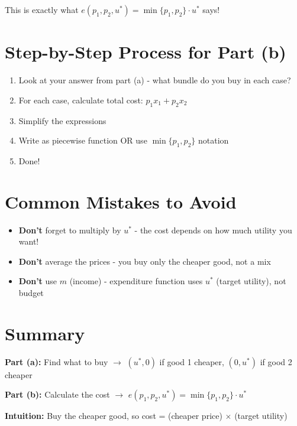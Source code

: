 \documentclass[11pt]{article}
\begin{document}
This is exactly what $e(p_1, p_2, u^*) = \min\{p_1, p_2\} \cdot u^*$ says!

\section{Step-by-Step Process for Part (b)}

\begin{enumerate}
\item Look at your answer from part (a) - what bundle do you buy in each case?
\item For each case, calculate total cost: $p_1 x_1 + p_2 x_2$
\item Simplify the expressions
\item Write as piecewise function OR use $\min\{p_1, p_2\}$ notation
\item Done!
\end{enumerate}

\section{Common Mistakes to Avoid}

\begin{itemize}
\item \textbf{Don't} forget to multiply by $u^*$ - the cost depends on how much utility you want!
\item \textbf{Don't} average the prices - you buy only the cheaper good, not a mix
\item \textbf{Don't} use $m$ (income) - expenditure function uses $u^*$ (target utility), not budget
\end{itemize}

\section{Summary}

\begin{tcolorbox}[colback=blue!5!white,colframe=blue!75!black,title=TL;DR]
\textbf{Part (a):} Find what to buy $\rightarrow$ $(u^*, 0)$ if good 1 cheaper, $(0, u^*)$ if good 2 cheaper

\textbf{Part (b):} Calculate the cost $\rightarrow$ $e(p_1, p_2, u^*) = \min\{p_1, p_2\} \cdot u^*$

\textbf{Intuition:} Buy the cheaper good, so cost = (cheaper price) $\times$ (target utility)
\end{tcolorbox}
\end{document}
